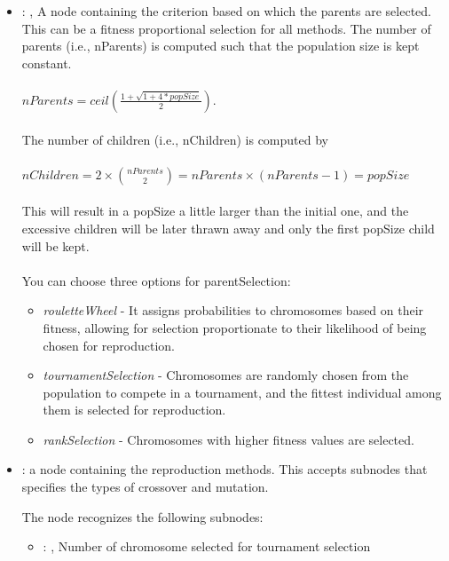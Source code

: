 \begin{itemize}
\begin{itemize}
        \item {}: ,
          A node containing the criterion based on which the parents are selected. This can be a
          fitness proportional selection for all methods.                   The number of parents
          (i.e., nParents) is computed such that the population size is kept constant. \\\\
          $nParents = ceil(\frac{1 + \sqrt{1+4*popSize}}{2})$. \\\\                   The number of
          children (i.e., nChildren) is computed by \\\\                   $nChildren = 2 \times
          {nParents \choose 2} = nParents \times (nParents-1) = popSize$ \\\\                   This
          will result in a popSize a little larger than the initial one, and the excessive children
          will be later thrawn away and only the first popSize child will be kept. \\\\
          You can choose three options for parentSelection:                       \begin{itemize}
          \item \textit{rouletteWheel} - It assigns probabilities to chromosomes based on their
          fitness,                           allowing for selection proportionate to their
          likelihood of being chosen for reproduction.                           \item
          \textit{tournamentSelection} - Chromosomes are randomly chosen from the population to
          compete in a tournament,                           and the fittest individual among them
          is selected for reproduction.                           \item \textit{rankSelection} -
          Chromosomes with higher fitness values are selected.                       \end{itemize}

        \item {}:
          a node containing the reproduction methods. This accepts subnodes that specifies the types
          of crossover and mutation.

          The  node recognizes the following subnodes:
          \begin{itemize}
            \item {}: ,
              Number of chromosome selected for tournament selection


\end{itemize}
\end{itemize}
\end{itemize}
